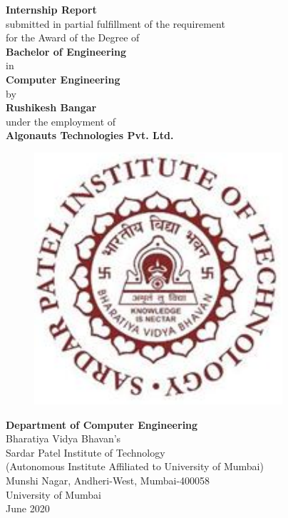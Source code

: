 \begin{titlepage}
\vspace*{0.25cm}
{\centering
\large
{\Large\textbf {Internship Report}}\\
\vspace{0.75cm}
submitted in partial fulfillment of the requirement\\
for the Award of the Degree of\\\vspace{1cm}
{\large\textbf {Bachelor of Engineering}}\\
in \\
{\large\textbf {Computer Engineering}}\\
\vspace{0.75cm}
by\\
\vspace{0.75cm}
{\large \textbf {Rushikesh Bangar}}\\
\vspace{0.75cm} 
under the employment of\\ 
\vspace{0.75cm}
\hspace{.05cm} {\large \textbf {Algonauts Technologies Pvt. Ltd.}}\\
\begin{figure}[h]
\centering
\includegraphics[scale=0.8]{spitlogo.pdf}
\end{figure}
\hspace{.05cm}
\hspace{.05cm}
\textbf {Department of Computer Engineering}\\
Bharatiya  Vidya Bhavan's\\
Sardar Patel Institute of Technology\\
(Autonomous Institute Affiliated to University of Mumbai)\\
Munshi Nagar, Andheri-West, Mumbai-400058\\
University of Mumbai\\
\hspace{6.25cm}June 2020}\\
\end{titlepage}
\newpage

